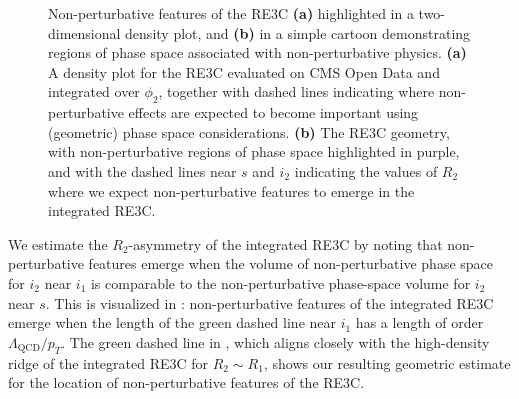 \begin{figure}[t]
    \centering
    \caption[Non-perturbative features of the resolved three-point energy correlator.]{
        Non-perturbative features of the RE3C \textbf{(a)} highlighted in a two-dimensional density plot, and \textbf{(b)} in a simple cartoon demonstrating regions of phase space associated with non-perturbative physics.
        \textbf{(a)}
        A density plot for the RE3C evaluated on CMS Open Data and integrated over \(\phi_2\), together with dashed lines indicating where non-perturbative effects are expected to become important using (geometric) phase space considerations.
        \textbf{(b)}
        The RE3C geometry, with non-perturbative regions of phase space highlighted in purple, and with the dashed lines near \(s\) and \(i_2\) indicating the values of \(R_2\) where we expect non-perturbative features to emerge in the integrated RE3C.
    }
	\label{fig:nonpert}
\end{figure}

We estimate the \(R_2\)-asymmetry of the integrated RE3C by noting that non-perturbative features emerge when the volume of non-perturbative phase space for \(i_2\) near \(i_1\) is comparable to the non-perturbative phase-space volume for \(i_2\) near \(s\).
%
This is visualized in :
%
non-perturbative features of the integrated RE3C emerge when the length of the green dashed line near \(i_1\) has a length of order \(\Lambda_\text{QCD}/p_T\).
%
The green dashed line in , which aligns closely with the high-density ridge of the integrated RE3C for \(R_2 \sim R_1\), shows our resulting geometric estimate for the location of non-perturbative features of the RE3C.




